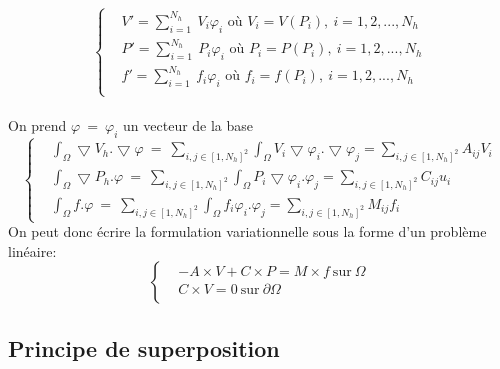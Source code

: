 \documentclass[a4paper,12pt,titlepage]{report}
\begin{document}
\begin{onehalfspace}
\begin{equation*}
  \left\{
    \begin{aligned}
 &V '= \sum_{i=1}^{N_{h}}{\ V_{i}\varphi_{i}} \text{ \ \ où } V_{i} = V(P_{i}),\  i= 1,2,...,N_{h}\\
 &P '= \sum_{i=1}^{N_{h}}{\ P_{i}\varphi_{i}} \text{ \ \ où } P_{i} = P(P_{i}),\  i= 1,2,...,N_{h}\\
 &f' = \sum_{i=1}^{N_{h}}{\ f_{i}\varphi_{i}} \text{ \ \ où } f_{i} = f(P_{i}),\  i= 1,2,...,N_{h}\\
\end{aligned}
  \right.
\end{equation*}$ $ \\ 
On prend $\varphi\ =\ \varphi_{i}$ un vecteur de la base
\begin{equation*}
  \left\{
    \begin{aligned}
	&\int_{\Omega}\bigtriangledown V_{h}.\bigtriangledown \varphi\ 
	=\ 
	\sum_{i, j \in [1, N_{h}]^{2}} \int_{\Omega}V_{i}\bigtriangledown\varphi_{i}. \bigtriangledown\varphi_{j} 
	= 
	\sum_{i,j \in [1, N_{h}]^{2}} A_{ij} V_{i}\\
	&\int_{\Omega}\bigtriangledown P_{h}.\varphi\ 
	=\ 
	\sum_{i, j \in [1, N_{h}]^{2}} \int_{\Omega}P_{i}\bigtriangledown\varphi_{i}. \varphi_{j} 
	= 
	\sum_{i,j \in [1, N_{h}]^{2}}C_{ij} u_{i}\\
	&\int_{\Omega} f. \varphi\ 
	=\ 
	\sum_{i, j \in [1, N_{h}]^{2}} \int_{\Omega}f_{i}\varphi_{i}. \varphi_{j} 
	= 
	\sum_{i,j \in [1, N_{h}]^{2}} M_{ij} f_{i}\end{aligned}
  \right.
\end{equation*}
On peut donc écrire la formulation variationnelle sous la forme d'un problème linéaire:
\begin{equation*}
  \left\{
    \begin{aligned}
	&-A\times V + C \times P = M	\times f \ \text{sur} \ \Omega\\
	& C\times V = 0 \ \text{sur} \  \partial\Omega\\
	\end{aligned}
  \right.
\end{equation*}

\subsection{Principe de superposition}


\end{onehalfspace}
\end{document}
